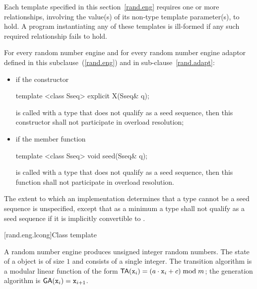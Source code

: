 \pnum
Each template specified in this section~\ref{rand.eng}
requires one or more relationships,
involving the value(s) of its non-type template parameter(s), to hold.
A program instantiating any of these templates
is ill-formed
if any such required relationship fails to hold.

\pnum
For every random number engine and for every random number engine adaptor 
defined in this subclause~(\ref{rand.eng}) and in sub-clause~\ref{rand.adapt}:

\begin{itemize}
\item
if the constructor
\begin{codeblock}
template <class Sseq> explicit X(Sseq& q);
\end{codeblock}
is called with a type  that does not qualify as a seed sequence, then this
constructor shall not participate in overload resolution;

\item
if the member function
\begin{codeblock}
template <class Sseq> void seed(Sseq& q);
\end{codeblock}
is called with a type  that does not qualify as a seed sequence, then this
function shall not participate in overload resolution.
\end{itemize}

The extent to which an implementation determines that a type cannot be a seed sequence
is unspecified, except that as a minimum a type shall not qualify as a seed sequence
if it is implicitly convertible to .


[rand.eng.lcong]{Class template }%
%

\pnum
A  random number engine
produces unsigned integer random numbers.
The state%
of a  object 
is of size $1$
and consists of a single integer.
The transition algorithm%
%
is a modular linear function of the form
$\mathsf{TA}(\texttt{x}_{i}) = (a \cdot \texttt{x}_{i} + c) \bmod m$;
the generation algorithm%
%
is $ \mathsf{GA}(\texttt{x}_{i}) = \texttt{x}_{i+1} $.

